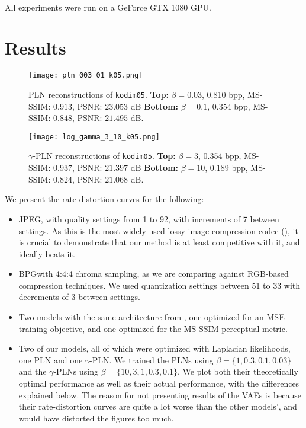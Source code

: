 \paragraph{}
All experiments were run on a GeForce GTX 1080 GPU.

\section{Results}
\begin{figure}
  \centering
  \texttt{[image: pln\_003\_01\_k05.png]}
  \caption[PLN reconstructions of \texttt{kodim05}.]
  {PLN reconstructions of \texttt{kodim05}. \textbf{Top:} $\beta =
    0.03$, 0.810 bpp, MS-SSIM: $0.913$, PSNR: $23.053$ dB \textbf{Bottom:}
    $\beta = 0.1$, 0.354 bpp, MS-SSIM: $0.848$, PSNR: $21.495$ dB.}
  \label{fig:pln_reconstruction}
\end{figure}
\begin{figure}
  \centering
  \texttt{[image: log\_gamma\_3\_10\_k05.png]}
  \caption[$\gamma$-PLN reconstructions of \texttt{kodim05}.]
  {$\gamma$-PLN reconstructions of \texttt{kodim05}. \textbf{Top:}
    $\beta = 3$, 0.354 bpp, MS-SSIM: $0.937$, PSNR: $21.397$ dB \textbf{Bottom:}
    $\beta = 10$, 0.189 bpp, MS-SSIM: $0.824$, PSNR: $21.068$ dB.}
  \label{fig:gamma_reconstruction}
\end{figure}
\par

We present the rate-distortion curves for the following:
\begin{itemize}
\item JPEG, with quality settings from 1 to 92, with increments of 7 between
  settings. As this is the most widely used lossy image compression codec
  (\cite{bull2014communicating}), it is
  crucial to demonstrate that our method is at least competitive with it, and
  ideally beats it.
\item BPG\footnotemark with 4:4:4 chroma sampling, as we are comparing against
  RGB-based compression techniques. We used quantization settings between 51 to
  33 with decrements of 3 between settings.
\item Two models with the same architecture from \cite{balle2018variational},
  one optimized for an MSE training objective, and one optimized for the
  MS-SSIM perceptual metric.
\item Two of our models, all of which were optimized with Laplacian likelihoods,
  one PLN and one $\gamma$-PLN. We trained the PLNs using $\beta =
  \{1, 0.3, 0.1, 0.03\}$ and the $\gamma$-PLNs using $\beta =
  \{10, 3, 1, 0.3, 0.1\}$. We plot both their theoretically optimal
  performance as well as their actual performance, with the differences
  explained below. The reason for not presenting results of the VAEs is because
  their rate-distortion curves are quite a lot worse than the other
  models', and would have distorted the figures too much.
\end{itemize}


